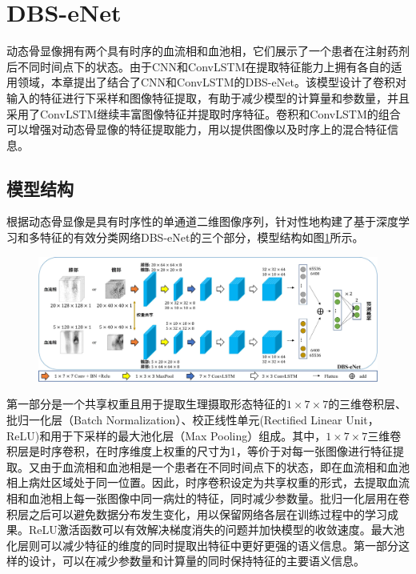 \section{{\tm DBS-eNet}}

动态骨显像拥有两个具有时序的血流相和血池相，它们展示了一个患者在注射药剂后不同时间点下的状态。由于CNN和ConvLSTM在提取特征能力上拥有各自的适用领域，本章提出了结合了CNN和ConvLSTM的DBS-eNet。该模型设计了卷积对输入的特征进行下采样和图像特征提取，有助于减少模型的计算量和参数量，并且采用了ConvLSTM继续丰富图像特征并提取时序特征。卷积和ConvLSTM的组合可以增强对动态骨显像的特征提取能力，用以提供图像以及时序上的混合特征信息。

\subsection{模型结构}

根据动态骨显像是具有时序性的单通道二维图像序列，针对性地构建了基于深度学习和多特征的有效分类网络DBS-eNet的三个部分，模型结构如图\ref{fig:chap03_framework}所示。

\begin{figure}[ht]
  \centering
  \includegraphics[width=\textwidth]{figures/chap03_framework.jpg}
  \label{fig:chap03_framework}
\end{figure}

第一部分是一个共享权重且用于提取生理摄取形态特征的\(1 \times 7 \times 7\)的三维卷积层、批归一化层（Batch Normalization）\cite{ioffe2015batch}、校正线性单元(Rectified Linear Unit，ReLU)和用于下采样的最大池化层（Max Pooling）组成。其中，\(1 \times 7 \times 7\)三维卷积层是时序卷积，在时序维度上权重的尺寸为1，等价于对每一张图像进行特征提取。又由于血流相和血池相是一个患者在不同时间点下的状态，即在血流相和血池相上病灶区域处于同一位置。因此，时序卷积设定为共享权重的形式，去提取血流相和血池相上每一张图像中同一病灶的特征，同时减少参数量。批归一化层用在卷积层之后可以避免数据分布发生变化，用以保留网络各层在训练过程中的学习成果。ReLU激活函数可以有效解决梯度消失的问题并加快模型的收敛速度。最大池化层则可以减少特征的维度的同时提取出特征中更好更强的语义信息。第一部分这样的设计，可以在减少参数量和计算量的同时保持特征的主要语义信息。


